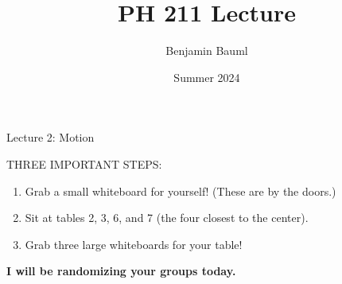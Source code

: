 \documentclass[]{article}
\title{PH 211 Lecture \Week}
\author{Benjamin Bauml}
\date{Summer 2024}
\begin{document}
\begin{TeacherMargin}

\end{TeacherMargin}
\begin{PresentSpace}
\begin{center}
	\huge Lecture 2: Motion
\end{center}
\vspace{1cm}
THREE IMPORTANT STEPS:
\begin{enumerate}
	\item Grab a small whiteboard for yourself! (These are by the doors.)
	\item Sit at tables 2, 3, 6, and 7 (the four closest to the center).
	\item Grab three large whiteboards for your table!
\end{enumerate}
\textbf{I will be randomizing your groups today.}
\end{PresentSpace}

\end{document}
